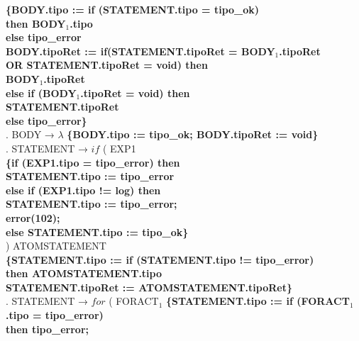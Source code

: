 \begin{tabbing}
    \>              \>\textbf{\{BODY.tipo := if (STATEMENT.tipo = tipo\_ok)}\\
    \>              \>          \>          \>\textbf{then BODY$_1$.tipo}\\
    \>              \>          \>\textbf{else tipo\_error}\\
    \>              \>\textbf{BODY.tipoRet := if(STATEMENT.tipoRet = BODY$_1$.tipoRet}\\
    \>              \>          \>\textbf{OR STATEMENT.tipoRet = void) then}\\
    \>              \>          \>          \>\textbf{BODY$_1$.tipoRet}\\
    \>              \>          \>\textbf{else if (BODY$_1$.tipoRet = void) then}\\
    \>              \>          \>          \>\textbf{STATEMENT.tipoRet}\\
    \>              \>          \>\textbf{else tipo\_error\}}\\
    . BODY → $\lambda$ \textbf{\{BODY.tipo := tipo\_ok; BODY.tipoRet := void\}}\\
    . STATEMENT → $if$ ( EXP1 \\
    \>              \>\textbf{\{if (EXP1.tipo = tipo\_error) then}\\
    \>              \>          \> \textbf{STATEMENT.tipo := tipo\_error}\\
    \>              \> \textbf{ else if (EXP1.tipo != log) then}\\
    \>              \>          \> \textbf{STATEMENT.tipo := tipo\_error;}\\
    \>              \>          \> \textbf{error(102);}\\
    \>              \> \textbf{else STATEMENT.tipo := tipo\_ok\}}\\
    \>              \> ) ATOMSTATEMENT\\
    \>              \> \textbf{\{STATEMENT.tipo := if (STATEMENT.tipo != tipo\_error)}\\
    \>              \>          \> \textbf{then ATOMSTATEMENT.tipo}\\
    \>              \> \textbf{STATEMENT.tipoRet := ATOMSTATEMENT.tipoRet\}}\\
    . STATEMENT → $for$ ( FORACT$_1$ \textbf{\{STATEMENT.tipo := if (FORACT$_1$.tipo = tipo\_error) }\\
    \>              \>          \>      \>\textbf{ then tipo\_error;} \\

\end{tabbing}
